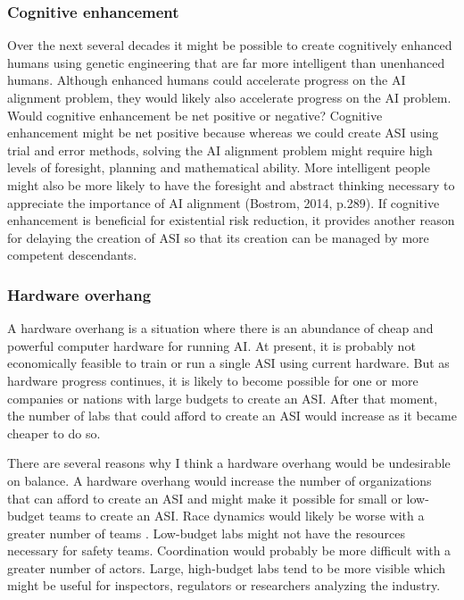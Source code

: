 \documentclass{article}
\begin{document}
\subsubsection{Cognitive enhancement}

Over the next several decades it might be possible to create cognitively enhanced humans using genetic engineering that are far more intelligent than unenhanced humans. Although enhanced humans could accelerate progress on the AI alignment problem, they would likely also accelerate progress on the AI problem. Would cognitive enhancement be net positive or negative? Cognitive enhancement might be net positive because whereas we could create ASI using trial and error methods, solving the AI alignment problem might require high levels of foresight, planning and mathematical ability. More intelligent people might also be more likely to have the foresight and abstract thinking necessary to appreciate the importance of AI alignment (Bostrom, 2014, p.289). If cognitive enhancement is beneficial for existential risk reduction, it provides another reason for delaying the creation of ASI so that its creation can be managed by more competent descendants.

\subsubsection{Hardware overhang}

A hardware overhang is a situation where there is an abundance of cheap and powerful computer hardware for running AI. At present, it is probably not economically feasible to train or run a single ASI using current hardware. But as hardware progress continues, it is likely to become possible for one or more companies or nations with large budgets to create an ASI. After that moment, the number of labs that could afford to create an ASI would increase as it became cheaper to do so.

There are several reasons why I think a hardware overhang would be undesirable on balance. A hardware overhang would increase the number of organizations that can afford to create an ASI and might make it possible for small or low-budget teams to create an ASI. Race dynamics would likely be worse with a greater number of teams \cite{superintelligence}. Low-budget labs might not have the resources necessary for safety teams. Coordination would probably be more difficult with a greater number of actors. Large, high-budget labs tend to be more visible which might be useful for inspectors, regulators or researchers analyzing the industry.
\end{document}
